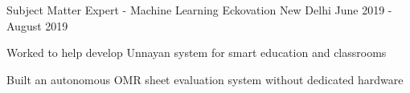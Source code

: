 
\smallskip
\begin{cventries}

  \cventry
    {Subject Matter Expert - Machine Learning} %
    {Eckovation} %
    {New Delhi} %
    {June 2019 - August 2019} %
    {
      \begin{cvitems} %
        \item {Worked to help develop Unnayan system for smart education and classrooms}
        \item {Built an autonomous OMR sheet evaluation system without dedicated hardware}
      \end{cvitems}
    }
\end{cventries}
